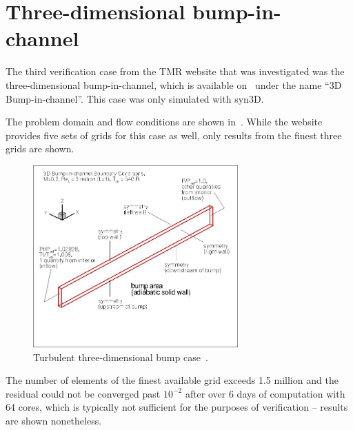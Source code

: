 \section{Three-dimensional bump-in-channel}
\label{sec:syn3dbump}
The third verification case from the TMR website that was investigated was the three-dimensional bump-in-channel, which is available on~\cite{tmr} under the name ``3D Bump-in-channel''. This case was only simulated with syn3D.

The problem domain and flow conditions are shown in~. While the website provides five sets of grids for this case as well, only results from the finest three grids are shown.
\begin{figure}
    \centering
    \includegraphics[width=0.7\textwidth]{figs/3dbump/bump3dBCpic1.jpg}
    \caption{Turbulent three-dimensional bump case~\cite{tmr}.}
    \label{fig:3dbump}
\end{figure}

The number of elements of the finest available grid exceeds 1.5 million and the residual could not be converged past $10^{-2}$ after over 6 days of computation with 64 cores, which is typically not sufficient for the purposes of verification -- results are shown nonetheless.

